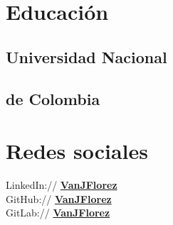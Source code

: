 \documentclass[]{CV-JuanCamiloFlorez}
\begin{document}
%
%
\lastupdated

%
%

%
%
\begin{minipage}[t]{0.33\textwidth} 

\section{Educación} 
\subsection{Universidad Nacional}
\subsection{de Colombia}
\sectionsep

\section{Redes sociales}
    LinkedIn:// \href{https://www.linkedin.com/in/vanjflores/}{\bf VanJFlorez} \\
    GitHub:// \href{https://github.com/jcammmmm}{\bf VanJFlorez} \\
    GitLab:// \href{https://gitlab.com/VanJFlorez}{\bf VanJFlorez} \\
\sectionsep


\end{minipage}
\end{document}
